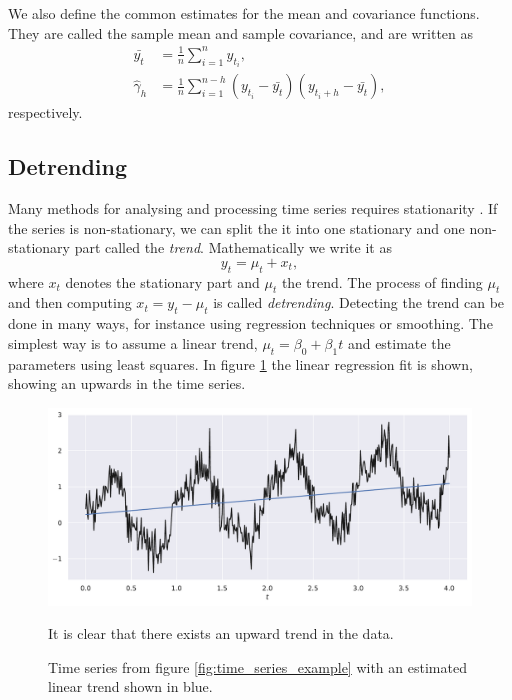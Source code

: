 \documentclass[a4paper]{memoir}
\theoremstyle{plain}
\theoremstyle{definition}
\theoremstyle{remark}
\begin{document}
We also define the common estimates for the mean and covariance functions.
They are called the sample mean and sample covariance, and are written as
\begin{align}\label{eq:sample_mean}
        \bar{y_t} &= \frac{1}{n}\sum_{i = 1}^{n} y_{t_i}, \\
        \label{eq:sample_covariance}
        \hat{\gamma}_h &= \frac{1}{n} \sum_{i = 1}^{n - h}(y_{t_i} - \bar{y_t})(y_{t_i  + h} - \bar{y_t}),
\end{align}
respectively.


\subsection{Detrending}
Many methods for analysing and processing time series requires stationarity \cite{shumway}.
If the series is non-stationary, we can split the it into one stationary and one non-stationary part called the \textit{trend}.
Mathematically we write it as 
\begin{equation*}
        y_t = \mu_t + x_t,
\end{equation*}
where $x_t$ denotes the stationary part and $\mu_t$ the trend.
The process of finding $\mu_t$ and then computing $x_t = y_t - \mu_t$ is called \textit{detrending}.
Detecting the trend can be done in many ways, for instance using regression techniques or smoothing.
The simplest way is to assume a linear trend, $\mu_t = \beta_0 + \beta_1 t$ and estimate the parameters using least squares.
In figure \ref{fig:time_series_example_with_trend} the linear regression fit is shown, showing an upwards in the time series.


\begin{figure}[tb]
        \centering
        \includegraphics[width=\linewidth]{./code/figures/time_series_example_with_trend.pdf}
        \caption{Time series from figure \ref{fig:time_series_example} with an estimated linear trend shown in blue.}
        It is clear that there exists an upward trend in the data.
        \label{fig:time_series_example_with_trend}
\end{figure}
\end{document}
